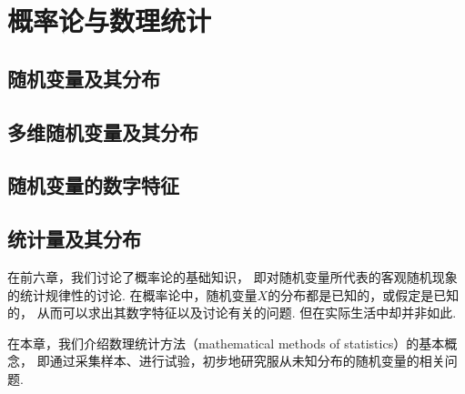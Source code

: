 \part{概率论与数理统计}
\begingroup
\def\x{\chi^2}%
\def\dotsim{\overset{.}{\sim}}%



\chapter{随机变量及其分布}





\chapter{多维随机变量及其分布}








\chapter{随机变量的数字特征}










\chapter{统计量及其分布}
在前六章，我们讨论了概率论的基础知识，
即对随机变量所代表的客观随机现象的统计规律性的讨论.
在概率论中，随机变量\(X\)的分布都是已知的，或假定是已知的，
从而可以求出其数字特征以及讨论有关的问题.
但在实际生活中却并非如此.

在本章，我们介绍数理统计方法（mathematical methods of statistics）的基本概念，
即通过采集样本、进行试验，初步地研究服从未知分布的随机变量的相关问题.









\endgroup

